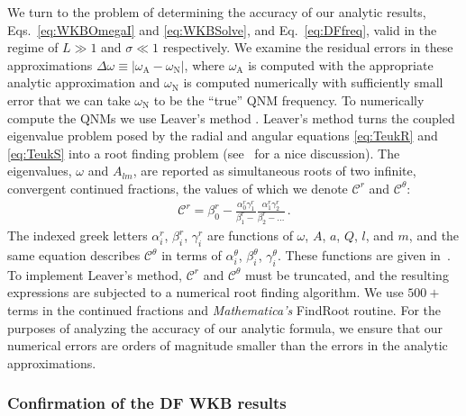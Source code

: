 \begin{refsection}
We turn to the problem of determining the accuracy of our analytic results, Eqs.~\eqref{eq:WKBOmegaI} and \eqref{eq:WKBSolve}, and Eq.~\eqref{eq:DFfreq}, valid in the regime of $L\gg1$ and $\sigma\ll1$ respectively. 
We examine the residual errors in these approximations $\Delta\omega \equiv |\omega_\text{A}-\omega_\text{N}|$, where $\omega_\text{A}$ is computed with the appropriate analytic approximation and $\omega_\text{N}$ is computed numerically with sufficiently small error that we can take $\omega_\text{N}$ to be the ``true'' QNM frequency. 
To numerically compute the QNMs we use Leaver's method \cite{Cook:2014cta, Berti:2005eb, Leaver1985, LeaverRN}. 
Leaver's method turns the coupled eigenvalue problem posed by the radial and angular equations \eqref{eq:TeukR} and \eqref{eq:TeukS} into a root finding problem (see~\cite{Cook:2014cta} for a nice discussion).
The eigenvalues, $\omega$ and $A_{lm}$, are reported as simultaneous roots of two infinite, convergent continued fractions, the values of which we denote $\mathcal C^r$ and $\mathcal C^\theta$:
\begin{align}
\label{eq:cfform}
{\mathcal C^r} = \beta_0^r-\frac{\alpha_0^r\gamma_1^r}{\beta_1^r-}\frac{\alpha_1^r\gamma_2^r}{\beta_2^r- \dots} \,.
\end{align}
The indexed greek letters $\alpha^r_i$, $\beta^r_i$, $\gamma^r_i$ are functions of $\omega$, $A$, $a$, $Q$, $l$, and $m$, and the same equation describes $\mathcal C^\theta$ in terms of $\alpha^\theta_i$, $\beta^\theta_i$, $\gamma^\theta_i$. These functions are given in~\cite{Berti:2005eb}.
To implement Leaver's method, $\mathcal C^r$ and $\mathcal C^\theta$ must be truncated, and the resulting expressions are subjected to a numerical root finding algorithm. 
We use $500+$ terms in the continued fractions and \textit{Mathematica's} FindRoot routine. 
For the purposes of analyzing the accuracy of our analytic formula, we ensure that our numerical errors are orders of magnitude smaller than the errors in the analytic approximations.

\subsubsection{Confirmation of the DF WKB results} \label{sec:WKBnum}


\end{refsection}
